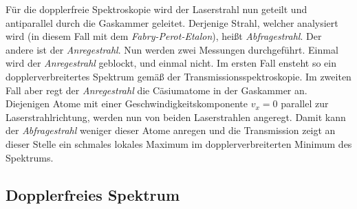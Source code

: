\documentclass[../bericht.tex]{subfiles}
\begin{document}
      F\"ur die dopplerfreie Spektroskopie wird der Laserstrahl nun geteilt und antiparallel durch die Gaskammer geleitet. Derjenige Strahl, welcher analysiert wird (in diesem Fall mit dem \textit{Fabry-Perot-Etalon}), hei\ss{}t \textit{Abfragestrahl}. Der andere ist der \textit{Anregestrahl}. Nun werden zwei Messungen durchgef\"uhrt. Einmal wird der \textit{Anregestrahl} geblockt, und einmal nicht. Im ersten Fall ensteht so ein dopplerverbreitertes Spektrum gem\"a\ss{} der Transmissionsspektroskopie. Im zweiten Fall aber regt der \textit{Anregestrahl} die C\"asiumatome in der Gaskammer an. Diejenigen Atome mit einer Geschwindigkeitskomponente $v_x=0$ parallel zur Laserstrahlrichtung, werden nun von beiden Laserstrahlen angeregt. Damit kann der \textit{Abfragestrahl} weniger dieser Atome anregen und die Transmission zeigt an dieser Stelle ein schmales lokales Maximum im dopplerverbreiterten Minimum des Spektrums.


      \subsection{Dopplerfreies Spektrum}
      \label{subsec:dopplerfreies-spektrum}
\end{document}
